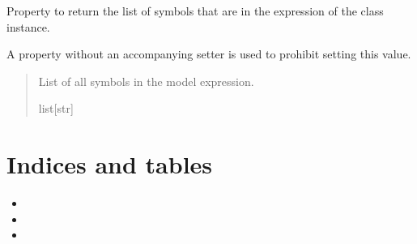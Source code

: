 \documentclass[letterpaper,10pt,english]{sphinxmanual}
\begin{document}
\begin{fulllineitems}

\begin{fulllineitems}
\label{\detokenize{VPCModel:src.VPCModel.VPCModel.symbols}}
\pysigstartsignatures
{}
\pysigstopsignatures
\sphinxAtStartPar
Property to return the list of symbols that are in the expression of the class instance.

\sphinxAtStartPar
A property without an accompanying setter is used to prohibit setting this value.
\begin{quote}\begin{description}
\sphinxAtStartPar
List of all symbols in the model expression.

\sphinxAtStartPar
list{[}str{]}

\end{description}\end{quote}

\end{fulllineitems}


\end{fulllineitems}



\chapter{Indices and tables}
\label{\detokenize{index:indices-and-tables}}\begin{itemize}
\item {} 
\sphinxAtStartPar
{}

\item {} 
\sphinxAtStartPar
{}

\item {} 
\sphinxAtStartPar
{}

\end{itemize}
\end{document}
